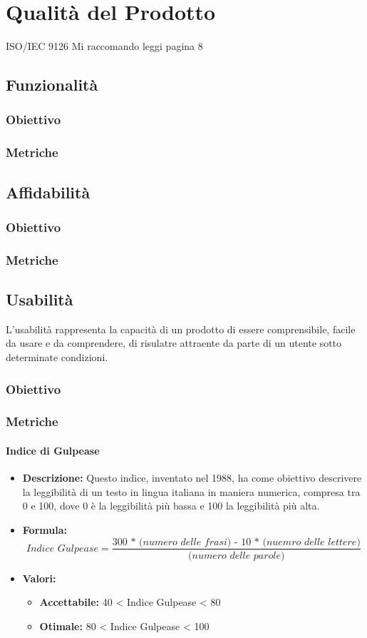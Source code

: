 \section{Qualità del Prodotto}
ISO/IEC 9126
Mi raccomando leggi pagina 8

\subsection{Funzionalità}
\subsubsection{Obiettivo}
\subsubsection{Metriche}
\subsection{Affidabilità}
\subsubsection{Obiettivo}
\subsubsection{Metriche}
\subsection{Usabilità}
L'usabilità rappresenta la capacità di un prodotto di essere comprensibile, facile da usare e da comprendere, di risulatre attraente da parte di un utente sotto determinate condizioni.
\subsubsection{Obiettivo}
\subsubsection{Metriche}
\paragraph{Indice di Gulpease}
\begin{itemize}
\item \textbf{Descrizione:} Questo indice, inventato nel 1988, ha come obiettivo descrivere la leggibilità di un testo in lingua italiana in maniera numerica, compresa tra 0 e 100, dove 0 è la leggibilità più bassa e 100 la leggibilità più alta. 
\item \textbf{Formula:} \[\textit{Indice Gulpease} = \frac{\textit{300 * (numero delle frasi) - 10 * (nuemro delle lettere)}}{\textit{(numero delle parole)}}\]
\item \textbf{Valori:}
    \begin{itemize}
        \item \textbf{Accettabile:} 40 < Indice Gulpease < 80
        \item \textbf{Otimale:} 80 < Indice Gulpease < 100
    \end{itemize}
\end{itemize}
